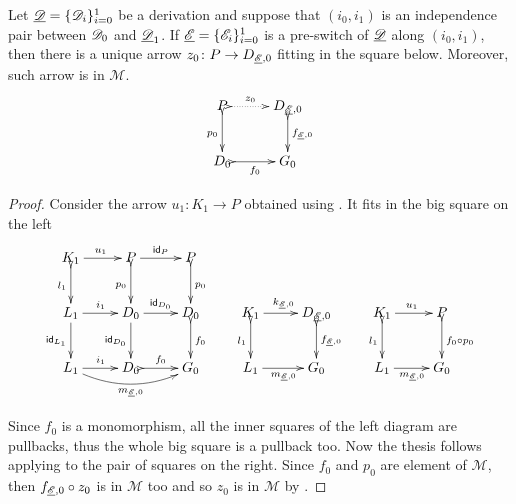 \begin{corollary}\label{lem:cose}Let
	$\underline{\mathscr{D}}=\{\mathscr{D}_i\}_{i=0}^1$ be a derivation and suppose
	that $(i_0, i_1)$ is an independence pair between $\mathscr{D}_0$
	and $\underline{\mathscr{D}}_1$.  If $\underline{\mathscr{E}}=\{\mathscr{E}_i\}_{i=0}^1$ is a
	pre-switch of $\underline{\mathscr{D}}$ along $(i_0, i_1)$, then there is a unique arrow
	$z_0\colon P\to D_{\underline{\mathscr{E}},0}$ fitting in the square below. Moreover, such arrow is in $\mathcal{M}$.
	\[\xymatrix{P \ar@{>.>}[r]^-{z_0}  \ar@{>->}[d]_{p_0}& D_{\der{E}, 0} \ar@{>->}[d]^{f_{\der{E},0}} \\ D_0 \ar@{>->}[r]_{f_0} & G_0 }\]
\end{corollary}
\begin{proof}
	Consider the arrow $u_1\colon K_1\to P$ obtained using
	. It fits in the big square on the left
	\[		\xymatrix{K_1 \ar[r]^{u_1} \ar@{>->}[d]_{l_1}&P
		\ar[r]^{\id{P}}\ar@{>->}[d]_{p_0}& P\ar@{>->}[d]^{p_0}\\L_1
		\ar[d]_{\id{L_1}}\ar[r]^{i_1}&D_0 \ar[r]^{\id{D_0}}
		\ar[d]_{\id{D_0}}& D_{0} \ar@{>->}[d]^{f_0}&K_1 \ar@{>->}[d]_{l_1}\ar[r]^{k_{\der{E},0}}&
		D_{\der{E},0} \ar@{>->}[d]^{f_{\der{E},0}} & K_1 \ar[r]^{u_1}
		\ar@{>->}[d]_{l_1}& P \ar@{>->}[d]^{f_0\circ
			p_0}\\
		L_1\ar[r]^{i_1} \ar@/_.4cm/[rr]_{m_{\der{E},0}}&D_0
		\ar@{>->}[r]^{f_0}&G_0 & L_1\ar[r]_{m_{\der{E},0}}&G_0 &L_1
		\ar[r]_{m_{\der{E},0}}&G_0}\]
	
	Since $f_0$ is a monomorphism, all the inner squares of the left diagram are pullbacks, thus the whole big square is a pullback too.
	Now the thesis follows applying  to the pair of squares on the right. Since $f_0$ and $p_0$ are element of $\mathcal{M}$, then $f_{\underline{\mathscr{E}},0}\circ z_0$ is in $\mathcal{M}$ too and so $z_0$ is in $\mathcal{M}$ by .	
	\end{proof}
	

